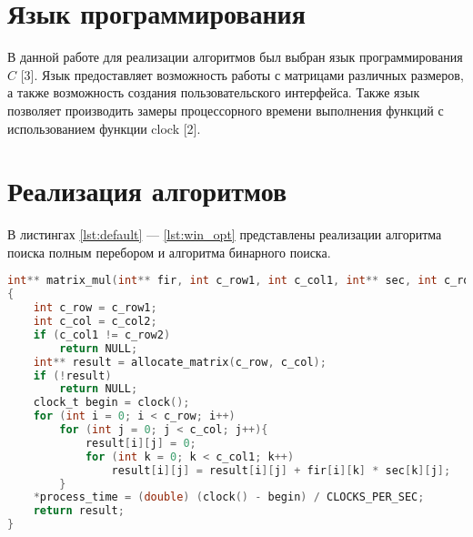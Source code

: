 \documentclass{bmstu}
\begin{document}
\section{Язык программирования}
В данной работе для реализации алгоритмов был выбран язык программирования $C$ [3]. Язык предоставляет возможность работы с матрицами различных размеров, а также возможность создания пользовательского интерфейса. Также язык позволяет производить замеры процессорного времени выполнения функций с использованием функции clock [2].

\section{Реализация алгоритмов}

В листингах \ref{lst:default} --- \ref{lst:win_opt} представлены реализации алгоритма поиска полным перебором и алгоритма бинарного поиска.

\clearpage

\begin{center}
\captionsetup{justification=raggedright,singlelinecheck=off}
\begin{lstlisting}[label=lst:default, language=c, numbers=none, caption=Реализация стандартного алгоритма умножения матриц]
int** matrix_mul(int** fir, int c_row1, int c_col1, int** sec, int c_row2, int c_col2, double *process_time)
{
    int c_row = c_row1;
    int c_col = c_col2;
    if (c_col1 != c_row2)
        return NULL;
    int** result = allocate_matrix(c_row, c_col);
    if (!result)
        return NULL;
    clock_t begin = clock();
    for (int i = 0; i < c_row; i++)
        for (int j = 0; j < c_col; j++){
            result[i][j] = 0;
            for (int k = 0; k < c_col1; k++)
                result[i][j] = result[i][j] + fir[i][k] * sec[k][j];
        }
    *process_time = (double) (clock() - begin) / CLOCKS_PER_SEC;
    return result;
}
\end{lstlisting}
\end{center}
\end{document}
